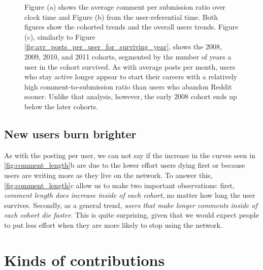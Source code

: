 \begin{figure*}[!tb]
\centering
{}
\caption{Figure (a) shows the average comment per submission ratio over clock time and Figure (b) from the user-referential time. Both figures show the cohorted trends and the overall users trends. Figure (c), similarly to Figure \ref{fig:avr_posts_per_user_for_surviving_year}, shows the 2008, 2009, 2010, and 2011 cohorts, segmented by the number of years a user in the cohort survived.  As with average posts per month, users who stay active longer appear to start their careers with a relatively high comment-to-submission ratio than users who abandon Reddit sooner.  Unlike that analysis, however, the early 2008 cohort ends up below the later cohorts.}
\label{fig:comments_submissions}
\end{figure*}

\subsection{New users burn brighter}
As with the posting per user, we can not say if the increase in the curves seen in \ref{fig:comment_length}b are due to the lower effort users dying first or because users are writing more as they live on the network. To answer this, \ref{fig:comment_length}c allow us to make two important observations: first, \textit{comment length does increase inside of each cohort}, no matter how long the user survives. Secondly, as a general trend, \textit{users that make longer comments inside of each cohort die faster}. This is quite surprising, given that we would expect people to put less effort when they are more likely to stop using the network.

\section{Kinds of contributions}

